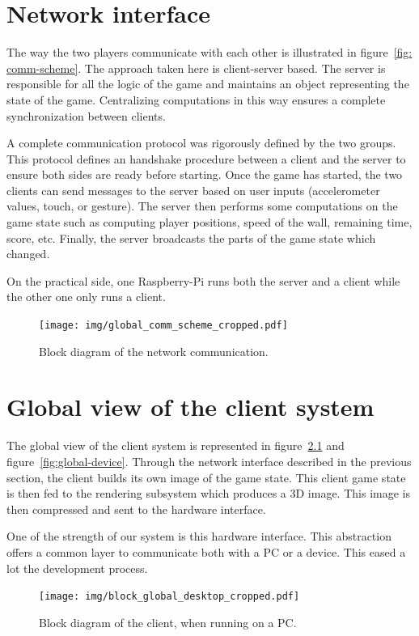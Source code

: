 \documentclass[english, DIV=13]{scrreprt}
\begin{document}
\chapter{Network interface}
The way the two players communicate with each other is illustrated in figure~\ref{fig:
comm-scheme}. The approach taken here is client-server based. The server is responsible
for all the logic of the game and maintains an object representing the state of the game.
Centralizing computations in this way ensures a complete synchronization between clients.

A complete communication protocol was rigorously defined by the two groups. This
protocol defines an handshake procedure between a client and the server to ensure both
sides are ready before starting. Once the game has started, the two clients can send
messages to the server based on user inputs (accelerometer values, touch, or gesture).
The server then performs some computations on the game state such as computing player
positions, speed of the wall, remaining time, score, etc. Finally, the server
broadcasts the parts of the game state which changed.

On the practical side, one Raspberry-Pi runs both the server and a client while the other
one only runs a client.

\begin{figure}
    \centering
    \texttt{[image: img/global\_comm\_scheme\_cropped.pdf]}
    \caption{Block diagram of the network communication.}
    \label{fig:comm-scheme}
\end{figure}

\chapter{Global view of the client system}
The global view of the client system is represented in figure~\ref{fig:global-desktop}
and figure~\ref{fig:global-device}. Through the network interface described in the
previous section, the client builds its own image of the game state. This client game
state is then fed to the rendering subsystem which produces a 3D image. This image
is then compressed and sent to the hardware interface.

One of the strength of our system is this hardware interface. This abstraction offers
a common layer to communicate both with a PC or a device. This eased a lot the development
process.

\begin{figure}
    \centering
    \texttt{[image: img/block\_global\_desktop\_cropped.pdf]}
    \caption{Block diagram of the client, when running on a PC.}
    \label{fig:global-desktop}
\end{figure}
\end{document}
